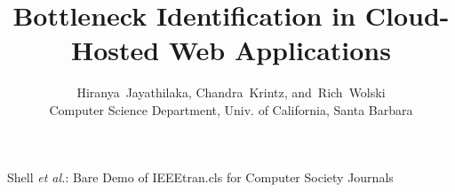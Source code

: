 \documentclass[10pt,journal,compsoc]{IEEEtran}
\begin{document}




%

\title{\LARGE Bottleneck Identification in Cloud-Hosted Web Applications}
\author{Hiranya~Jayathilaka,
        Chandra~Krintz,
        and~Rich~Wolski\\
Computer Science Department, Univ. of California, Santa Barbara}

%                                                                                                         
{Shell \MakeLowercase{\textit{et al.}}: Bare Demo of IEEEtran.cls for Computer Society Journals}

\end{document}
